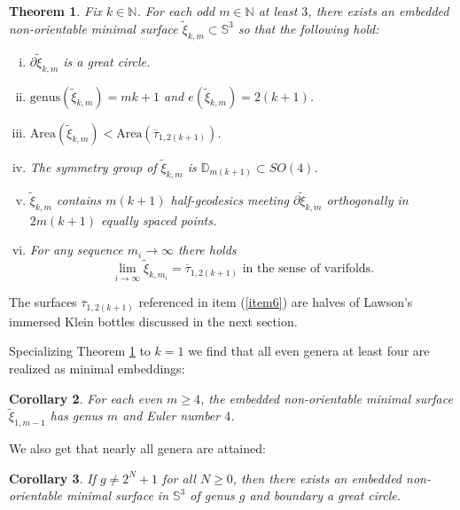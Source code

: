 \documentclass[11pt, reqno]{amsart}
\newtheorem{thm}{Theorem}[section]
\newtheorem{cor}[thm]{Corollary}
\numberwithin{equation}{section}
\begin{document}
\begin{thm}\label{main}
Fix $k\in\mathbb{N}$.  For each odd $m\in\mathbb{N}$ at least $3$, there exists an embedded non-orientable minimal surface $\tilde{\xi}_{k,m}\subset\mathbb{S}^3$ so that the following hold:
\begin{enumerate}[(i).]
\item $\partial\tilde{\xi}_{k,m}$ is a great circle. \label{item1}
\item $\mbox{genus}(\tilde{\xi}_{k,m})= mk+1$ and $e(\tilde{\xi}_{ k,m})=2(k+1)$.\label{genus}
\item $\mbox{Area}(\tilde{\xi}_{k,m})< \mbox{Area}(\overline{\tau}_{1,2(k+1)})$. \label{item3}
\item The symmetry group of $\tilde{\xi}_{k,m}$ is $\mathbb{D}_{m(k+1)}\subset SO(4)$. \label{item4}
\item $\tilde{\xi}_{k,m}$ contains $m(k+1)$ half-geodesics meeting $\partial\tilde{\xi}_{k,m}$  orthogonally in $2m(k+1)$ equally spaced points. \label{item5}
\item For any sequence $m_i\to\infty$ there holds \begin{equation}\lim_{i\to\infty} \tilde{\xi}_{k,m_i}= \overline{\tau}_{1,2(k+1)}\mbox{ in the sense of varifolds}.\end{equation} \label{item6}
\end{enumerate}
\end{thm}

The surfaces $\overline{\tau}_{1,2(k+1)}$ referenced in item (\ref{item6}) are halves of Lawson's immersed Klein bottles discussed in the next section.

Specializing Theorem \ref{main} to $k=1$ we find that all even genera at least four are realized as minimal embeddings:
\begin{cor}
For each even $m\geq 4$, the embedded non-orientable minimal surface $\tilde{\xi}_{1,m-1}$ has genus $m$ and Euler number $4$.
\end{cor}

We also get that nearly all genera are attained:
\begin{cor}
If $g\neq 2^N+1$ for all $N\geq 0$, then there exists an embedded non-orientable minimal surface in $\mathbb{S}^3$ of genus $g$ and boundary a great circle. 
\end{cor}
\end{document}
